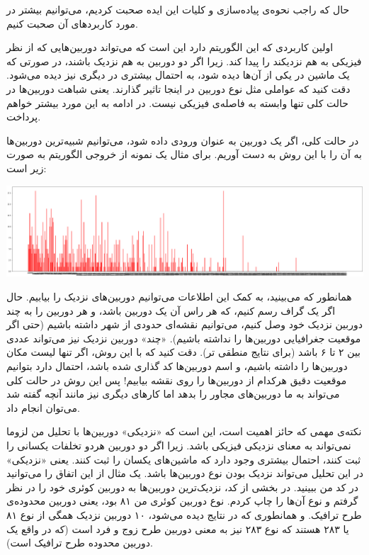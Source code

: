 حال که راجب نحوه‌ی پیاده‌سازی و کلیات این ایده صحبت کردیم، می‌توانیم بیشتر در مورد کاربرد‌های آن صحبت 
کنیم. 

اولین کاربردی که این الگوریتم دارد این است که می‌تواند دوربین‌هایی که از نظر 
فیزیکی به هم نزدیکند را پیدا کند. زیرا اگر دو دوربین به هم نزدیک باشند، در صورتی که 
یک ماشین در یکی از آن‌ها دیده شود، به احتمال بیشتری در دیگری نیز دیده می‌شود. 
دقت کنید که عواملی مثل نوع دوربین در اینجا تاثیر گذارند. یعنی شباهت دوربین‌ها در 
حالت کلی تنها وابسته به فاصله‌ی فیزیکی نیست. در ادامه به این مورد بیشتر خواهم پرداخت. 

در حالت کلی، اگر یک دوربین به عنوان ورودی داده شود، می‌توانیم شبیه‌ترین دوربین‌ها به آن را 
با این روش به دست آوریم. برای مثال یک نمونه از خروجی الگوریتم به صورت زیر است: 

\includegraphics[scale=0.2]{images/Pixie/1.png}


همانطور که می‌بینید، به کمک این اطلاعات می‌توانیم دوربین‌های نزدیک را بیابیم. 
حال اگر یک گراف رسم کنیم، که هر راس آن یک دوربین باشد، و هر دوربین را به 
چند دوربین نزدیک خود وصل کنیم، می‌توانیم نقشه‌ای حدودی‌ از شهر داشته باشیم (حتی اگر موقعیت جغرافیایی دوربین‌ها را نداشته باشیم). 
«چند»
دوربین نزدیک نیز می‌تواند عددی بین ۲ تا ۶ باشد (برای نتایج منطقی تر). دقت کنید که 
با این روش، اگر تنها لیست مکان دوربین‌ها را داشته باشیم، و اسم دوربین‌ها کد 
گذاری شده باشد، احتمال دارد بتوانیم موقعیت دقیق هرکدام از دوربین‌ها را 
روی نقشه بیابیم! پس این روش در حالت کلی می‌تواند به ما دوربین‌های مجاور را 
بدهد اما کار‌های دیگری نیز مانند آنچه گفته شد می‌توان انجام داد.

نکته‌ی مهمی که حائز اهمیت است، این است که «نزدیکی» دوربین‌ها با تحلیل من 
لزوما نمی‌تواند به معنای نزدیکی فیزیکی باشد. زیرا اگر دو دوربین هردو تخلفات یکسانی را ثبت کنند، 
احتمال بیشتری وجود دارد که ماشین‌های یکسان را ثبت کنند. یعنی «نزدیکی» در 
این تحلیل می‌تواند نزدیک بودن نوع دوربین‌ها باشد. یک مثال از این اتفاق را 
می‌توانید در کد من ببینید. در بخشی از کد، نزدیک‌ترین دوربین‌ها به دوربین کوئری خود را در نظر گرفتم 
و نوع آن‌ها را چاپ کردم. نوع دوربین کوئری من ۸۱ بود، یعنی دوربین محدوده‌ی طرح 
ترافیک. و همانطوری که در نتایج دیده می‌شود، ۱۰ دوربین نزدیک همگی از نوع ۸۱ یا ۲۸۳ هستند 
که نوع ۲۸۳ نیز به معنی دوربین طرح زوج و فرد است (که در واقع یک دوربین محدوده طرح ترافیک است). 

